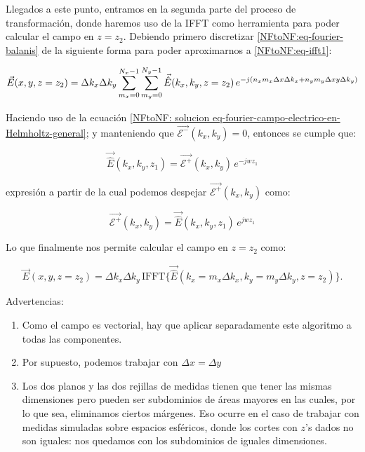 \documentclass{article}
\begin{document}
Llegados a este punto, entramos en la segunda parte del proceso de transformación, donde haremos uso de la IFFT como herramienta para poder calcular el campo en $z=z_2$. Debiendo primero discretizar \eqref{NFtoNF:eq-fourier-balanis} de la siguiente forma para poder aproximarnos a \eqref{NFtoNF:eq-ifft1}:

\begin{equation}
\vec{E}(x,y,z=z_{2}) =
\\
\Delta k_{x} \Delta k_{y}
\sum_{m_{x}=0}^{N_{x}-1}\sum_{m_{y}=0}^{N_{y}-1} 
\vec{\hat{E}}(k_{x},k_{y},z=z_{2})
\,e^{-j(n_{x}m_{x}\Delta x  \Delta k_{x} + n_{y}m_{y}\Delta xy  \Delta k_{y})}
\end{equation}

Haciendo uso de la ecuación \eqref{NFtoNF: solucion eq-fourier-campo-electrico-en-Helmholtz-general}; y manteniendo que $\vec{\mathcal{E}^{-}}(k_{x},k_{y})=0$, entonces se cumple que:

\begin{equation}
\vec{\hat{E}}(k_{x},k_{y},z_{1})=\vec{\mathcal{E}^{+}}(k_{x},k_{y})\,e^{-j
w z_{1}}
\end{equation}

expresión a partir de la cual podemos despejar $\vec{\mathcal{E}^{+}}(k_{x},k_{y})$ como:

\begin{equation}
\vec{\mathcal{E}^{+}}(k_{x},k_{y})=\vec{\hat{E}}(k_{x},k_{y},z_{1})\,e^{j
w z_{1}}
\label{NFtoNF:Ez2-cambio-fase}
\end{equation}

Lo que finalmente nos permite calcular el campo en $z=z_2$ como:

\begin{equation}
\vec{E}(x,y,z=z_{2})=\Delta k_{x} \Delta
k_{y}\,\mbox{IFFT}\{\vec{\hat{E}}(k_{x}=m_{x}\Delta
k_{x},k_{y}=m_{y} \Delta k_{y},z=z_{2})\}.
\label{NFtoNF:Ez2-final}
\end{equation}

\newpage

Advertencias:
\begin{enumerate}
\item Como el campo es vectorial, hay que aplicar separadamente este
algoritmo a todas las componentes.
\item Por supuesto, podemos trabajar con $\Delta x=\Delta y$
\item Los dos planos y las dos rejillas de medidas tienen que tener las mismas
dimensiones pero pueden ser subdominios de áreas mayores en las
cuales, por lo que sea, eliminamos ciertos márgenes. Eso ocurre en
el caso de trabajar con medidas simuladas sobre espacios esféricos,
donde los cortes con $z$'s dados no son iguales: nos quedamos con
los subdominios de iguales dimensiones.
\end{enumerate}
\end{document}
